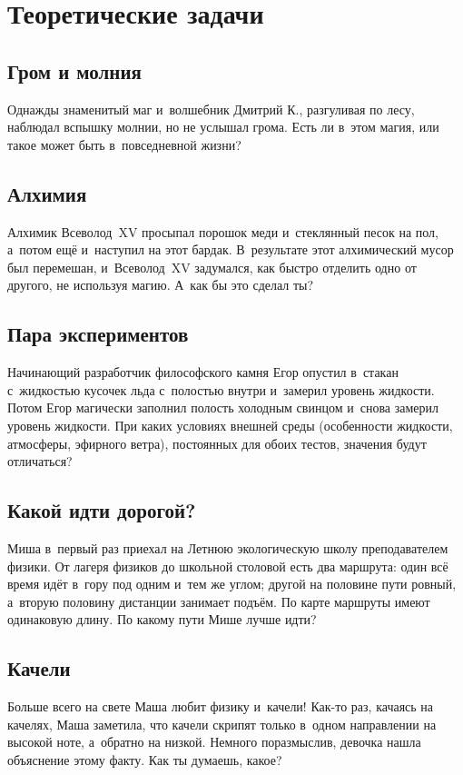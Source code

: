 \documentclass[a4paper,12pt]{article}
\begin{document}
\section{Теоретические задачи}

\subsection{Гром и молния}
Однажды знаменитый маг и~волшебник Дмитрий К., разгуливая по лесу, наблюдал вспышку молнии,
но не услышал грома. Есть ли в~этом магия, или такое может быть в~повседневной жизни?

\subsection{Алхимия}
Алхимик Всеволод~XV просыпал порошок меди и~стеклянный песок на пол, а~потом ещё
и~наступил на этот бардак. В~результате этот алхимический мусор был перемешан,
и~Всеволод~XV задумался, как быстро отделить одно от другого, не используя магию.
А~как бы это сделал ты?

\subsection{Пара экспериментов}
Начинающий разработчик философского камня Егор опустил в~стакан с~жидкостью кусочек
льда с~полостью внутри и~замерил уровень жидкости. Потом Егор магически заполнил
полость холодным свинцом и~снова замерил уровень жидкости. При каких условиях
внешней среды (особенности жидкости, атмосферы, эфирного ветра), постоянных
для обоих тестов, значения будут отличаться?

\subsection{Какой идти дорогой?}
Миша в~первый раз приехал на Летнюю экологическую школу преподавателем физики.
От лагеря физиков до школьной столовой есть два маршрута: один всё время идёт в~гору
под одним и~тем же углом; другой на половине пути ровный, а~вторую половину
дистанции занимает подъём. По карте маршруты имеют одинаковую длину.
По какому пути Мише лучше идти?

\subsection{Качели}
Больше всего на свете Маша любит физику и~качели! Как-то раз, качаясь на качелях,
Маша заметила, что качели скрипят только в~одном направлении на высокой ноте,
а~обратно на низкой. Немного поразмыслив, девочка нашла объяснение этому факту.
Как ты думаешь, какое?
\end{document}
